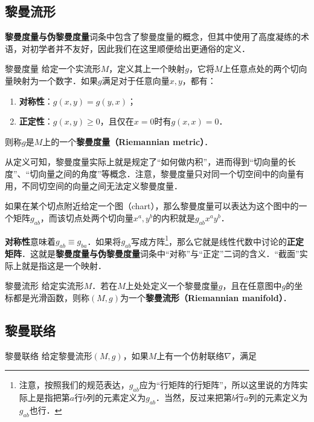 

\subsection{黎曼流形}

\textbf{黎曼度量与伪黎曼度量}词条中包含了黎曼度量的概念，但其中使用了高度凝练的术语，对初学者并不友好，因此我们在这里顺便给出更通俗的定义．

\begin{definition}{黎曼度量}
给定一个实流形$M$，定义其上一个映射$g$，它将$M$上任意点处的两个切向量映射为一个数字．如果$g$满足对于任意向量$x, y$，都有：
\begin{enumerate}
\item \textbf{对称性}：$g(x, y)=g(y, x)$；
\item \textbf{正定性}：$g(x, y)\geq 0$，且仅在$x=0$时有$g(x, x)=0$．
\end{enumerate}
则称$g$是$M$上的一个\textbf{黎曼度量（Riemannian metric）}．
\end{definition}

从定义可知，黎曼度量实际上就是规定了“如何做内积”，进而得到“切向量的长度”、“切向量之间的角度”等概念．注意，黎曼度量只对同一个切空间中的向量有用，不同切空间的向量之间无法定义黎曼度量．

如果在某个切点附近给定一个图（chart），那么黎曼度量可以表达为这个图中的一个矩阵$g_{ab}$，而该切点处两个切向量$x^a, y^b$的内积就是$g_{ab}x^ay^b$．

\textbf{对称性}意味着$g_{ab}\equiv g_{ba}$．如果将$g_{ab}$写成方阵\footnote{注意，按照我们的规范表达，$g_{ab}$应为“行矩阵的行矩阵”，所以这里说的方阵实际上是指把第$a$行$b$列的元素定义为$g_{ab}$．当然，反过来把第$b$行$a$列的元素定义为$g_{ab}$也行．}，那么它就是线性代数中讨论的\textbf{正定矩阵}．这就是\textbf{黎曼度量与伪黎曼度量}词条中“对称”与“正定”二词的含义．“截面”实际上就是指这是一个映射．


\begin{definition}{黎曼流形}
给定实流形$M$．若在$M$上处处定义一个黎曼度量$g$，且在任意图中$g$的坐标都是光滑函数，则称$(M, g)$为一个\textbf{黎曼流形（Riemannian manifold）}．
\end{definition}





\subsection{黎曼联络}

\begin{definition}{黎曼联络}
给定黎曼流形$(M, g)$，如果$M$上有一个仿射联络$\nabla$，满足
\end{definition}





